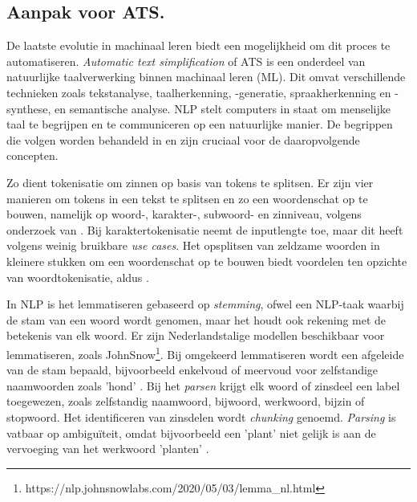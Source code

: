 \subsection{Aanpak voor ATS.}

De laatste evolutie in machinaal leren biedt een mogelijkheid om dit proces te automatiseren. \textit{Automatic text simplification} of ATS is een onderdeel van natuurlijke taalverwerking binnen machinaal leren (ML). Dit omvat verschillende technieken zoals tekstanalyse, taalherkenning, -generatie, spraakherkenning en -synthese, en semantische analyse. NLP stelt computers in staat om menselijke taal te begrijpen en te communiceren op een natuurlijke manier. De begrippen die volgen worden behandeld in \textcite{Sohom2019, Eisenstein2019} en zijn cruciaal voor de daaropvolgende concepten.

\medspace

Zo dient tokenisatie om zinnen op basis van tokens te splitsen. Er zijn vier manieren om tokens in een tekst te splitsen en zo een woordenschat op te bouwen, namelijk op woord-, karakter-, subwoord- en zinniveau, volgens onderzoek van \textcite{Menzli2023}. Bij karaktertokenisatie neemt de inputlengte toe, maar dit heeft volgens \textcite{Ribeiro2018} weinig bruikbare \textit{use cases}. Het opsplitsen van zeldzame woorden in kleinere stukken om een woordenschat op te bouwen biedt voordelen ten opzichte van woordtokenisatie, aldus \autocite{Iredale2022}.

\medspace

In NLP is het lemmatiseren gebaseerd op \textit{stemming}, ofwel een NLP-taak waarbij de stam van een woord wordt genomen, maar het houdt ook rekening met de betekenis van elk woord. Er zijn Nederlandstalige modellen beschikbaar voor lemmatiseren, zoals JohnSnow\footnote{https://nlp.johnsnowlabs.com/2020/05/03/lemma\_nl.html}. Bij omgekeerd lemmatiseren wordt een afgeleide van de stam bepaald, bijvoorbeeld enkelvoud of meervoud voor zelfstandige naamwoorden zoals 'hond' \autocite{Eisenstein2019}. Bij het \textit{parsen} krijgt elk woord of zinsdeel een label toegewezen, zoals zelfstandig naamwoord, bijwoord, werkwoord, bijzin of stopwoord. Het identificeren van zinsdelen wordt \textit{chunking} genoemd. \textit{Parsing} is vatbaar op ambiguïteit, omdat bijvoorbeeld een 'plant' niet gelijk is aan de vervoeging van het werkwoord 'planten' \autocite{Eisenstein2019}.

